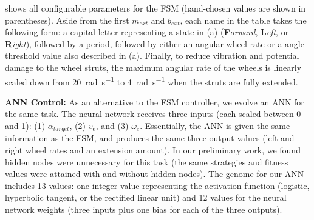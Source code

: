 %
 shows all configurable parameters for the FSM (hand-chosen values are shown in parentheses).
%
Aside from the first $m_{\mathit{ext}}$ and $b_{\mathit{ext}}$, each name in the table takes the following form: a capital letter representing a state in (a) (\textbf{F}\emph{orward}, \textbf{L}\emph{eft}, or \textbf{R}\emph{ight}), followed by a period, followed by either an angular wheel rate or a angle threshold value also described in (a).
%
Finally, to reduce vibration and potential damage to the wheel struts, the maximum angular rate of the wheels is linearly scaled down from 20~\si{\radian\per\second} to 4~\si{\radian\per\second} when the struts are fully extended.



%
%


\noindent
\textbf{ANN Control:}
As an alternative to the FSM controller, we evolve an ANN for the same task.
%
The neural network receives three inputs (each scaled between 0 and 1): (1) $\alpha_{\mathit{target}}$, (2) $v_e$, and (3) $\omega_e$.
%
Essentially, the ANN is given the same information as the FSM, and produces the same three output values (left and right wheel rates and an extension amount).
%
%
In our preliminary work, we found hidden nodes were unnecessary for this task (the same strategies and fitness values were attained with and without hidden nodes).
%
The genome for our ANN includes 13 values: one integer value representing the activation function (logistic, hyperbolic tangent, or the rectified linear unit) and 12 values for the neural network weights (three inputs plus one bias for each of the three outputs).



